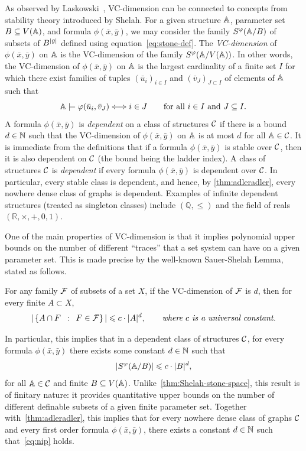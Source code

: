 As observed by Laskowski~\cite{laskowski1992vapnik}, VC-dimension can be connected to concepts from stability theory introduced by Shelah.
For a given structure $\str A$, parameter set $B\subseteq V(\str A)$, and formula $\phi(\bar x,\bar y)$,
we may consider the family $S^\phi(\str A/B)$ of subsets of $B^{|\tup y|}$ defined using equation~\eqref{eq:stone-def}.
The \emph{VC-dimension} of $\phi(\bar x,\bar y)$ on $\str A$ is the VC-dimension of the family $S^\phi(\str A/V(\str A))$. 
In other words, the VC-dimension of $\phi(\bar x,\bar y)$
on $\str A$ is the largest cardinality of a finite
set $I$ for which there exist families of tuples $(\bar u_i)_{i\in I}$ and $(\bar v_J)_{J\subset I}$
of elements of $\str A$
such that  $$\strA\models\phi(\tup{u}_i,\tup{v}_J)\Longleftrightarrow i\in J\qquad \text {for all $i\in I$ and $J\subset I$.}$$
A formula $\phi(\bar x,\bar y)$ is \emph{dependent} on a class of structures $\cal C$
if there is a bound $d\in\N$ such that the VC-dimension of $\phi(\bar x,\bar y)$ on $\str A$ is at most $d$ for all $\str A\in\cal C$.
It is immediate from the definitions  that if a formula $\phi(\bar x,\bar y)$ is stable over $\cal C$, then it is also dependent on $\cal C$ (the bound being the ladder index). 
A class of structures  $\cal C$ is {\em{dependent}} if every formula $\phi(\bar x,\bar y)$ is dependent over $\cal C$. 
In particular, every stable class is dependent, and hence, by \cref{thm:adleradler}, every nowhere dense class of graphs is dependent.
Examples of infinite dependent structures (treated as singleton classes) include 
$(\mathbb Q,\le )$ and the field of reals $(\mathbb R,\times,+,0,1)$. 

One of the main properties of VC-dimension is that it implies polynomial upper bounds on the number of different ``traces'' that a set system can have on a given parameter set.
This is made precise by the well-known Sauer-Shelah Lemma, stated as follows.
\begin{theorem}\label{thm:sauer-shelah}
  For any family $\FFF$ of subsets of a set $X$, if the VC-dimension of $\FFF$ is $d$,
  then for every finite $A\subset X$,
$$|\setof{A\cap F}{F\in {\cal F}}|\le c\cdot |A|^d,  
\qquad\textit{where $c$ is a universal constant.}$$
\end{theorem}
In particular, this implies that 
in a dependent class of structures $\cal C$, 
for every formula $\phi(\bar x,\bar y)$
there exists some constant $d\in \N$
such that
\begin{equation}\label{eq:nip}
|S^\phi(\str A/B)|\le c\cdot |B|^d,	
\end{equation}
for all $\str A\in\cal C$ and finite $B\subset V(\str A)$.
Unlike~\cref{thm:Shelah-stone-space}, this result 
is of finitary nature: it provides quantitative upper bounds on the number of different definable subsets of a given finite parameter set. 
Together with~\cref{thm:adleradler}, this implies that for every nowhere dense class of graphs $\cal C$
and every first order formula $\phi(\bar x,\bar y)$,
there exists a constant $d\in\N$ such that~\eqref{eq:nip} holds. 

